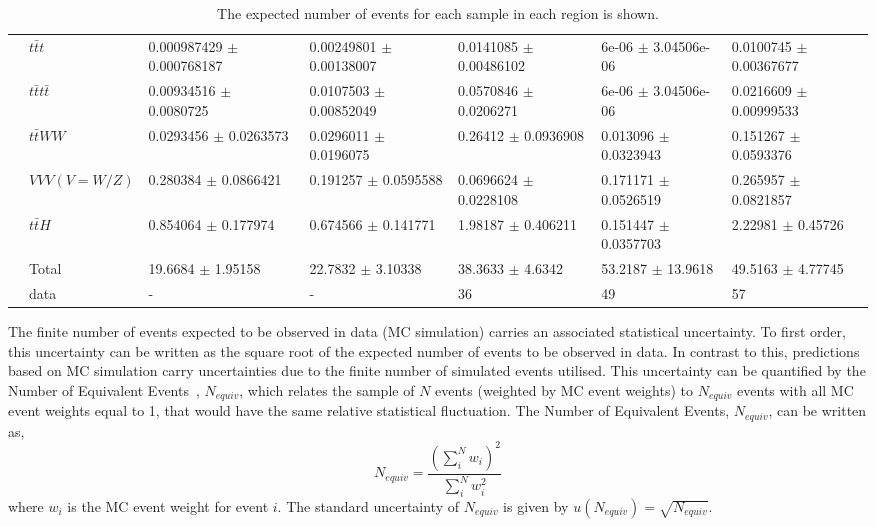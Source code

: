 \begin{table}[h!]
{\begin{tabular}{|ll|l|l|l|l|l|}
\multicolumn{1}{|l|}{}                       & $t\bar{t}t$          & 0.000987429 $\pm$ 0.000768187 & 0.00249801 $\pm$ 0.00138007 & 0.0141085 $\pm$ 0.00486102 & 6e-06 $\pm$ 3.04506e-06     & 0.0100745 $\pm$ 0.00367677 \\
\multicolumn{1}{|l|}{}                       & $t\bar{t}t\bar{t}$         & 0.00934516 $\pm$ 0.0080725    & 0.0107503 $\pm$ 0.00852049  & 0.0570846 $\pm$ 0.0206271  & 6e-06 $\pm$ 3.04506e-06     & 0.0216609 $\pm$ 0.00999533 \\
\multicolumn{1}{|l|}{}                       & $t\bar{t}WW$         & 0.0293456 $\pm$ 0.0263573     & 0.0296011 $\pm$ 0.0196075   & 0.26412 $\pm$ 0.0936908    & 0.013096 $\pm$ 0.0323943    & 0.151267 $\pm$ 0.0593376   \\
\multicolumn{1}{|l|}{}                       & $VVV (V = W/Z)$           & 0.280384 $\pm$ 0.0866421      & 0.191257 $\pm$ 0.0595588    & 0.0696624 $\pm$ 0.0228108  & 0.171171 $\pm$ 0.0526519    & 0.265957 $\pm$ 0.0821857   \\
\multicolumn{1}{|l|}{}                       & $t\bar{t}H$          & 0.854064 $\pm$ 0.177974       & 0.674566 $\pm$ 0.141771     & 1.98187 $\pm$ 0.406211     & 0.151447 $\pm$ 0.0357703    & 2.22981 $\pm$ 0.45726      \\ \hline
                                             & Total        & 19.6684 $\pm$ 1.95158         & 22.7832 $\pm$ 3.10338       & 38.3633 $\pm$ 4.6342       & 53.2187 $\pm$ 13.9618       & 49.5163 $\pm$ 4.77745      \\ \hline
                                             & data         & -                                         & -                                       & 36                                      & 49                                       & 57                                      \\ \hline
\end{tabular}}
\caption{The expected number of events for each sample in each region is shown.}
\label{tab:4Lep-PreFit-Yields}
\end{table}
The finite number of events expected to be observed in data (MC simulation) carries an associated statistical uncertainty. To first order, this uncertainty can be written as the square root of the expected number of events to be observed in data. In contrast to this, predictions based on MC simulation carry uncertainties due to the finite number of simulated events utilised. This uncertainty can be quantified by the Number of Equivalent Events~\cite{N_equiv_Derivation}, $N_{equiv}$, which relates the sample of $N$ events (weighted by MC event weights) to $N_{equiv}$ events with all MC event weights equal to 1, that would have the same relative statistical fluctuation. The Number of Equivalent Events, $N_{equiv}$, can be written as,
\begin{equation}
N_{equiv} = \frac{ (\sum_{i}^{N} w_{i})^2  }{\sum_{i}^{N} w_i^2 }
\end{equation}
where $w_i$ is the MC event weight for event $i$. The standard uncertainty of $N_{equiv}$ is given by $u(N_{equiv}) = \sqrt{N_{equiv}}$.\\

